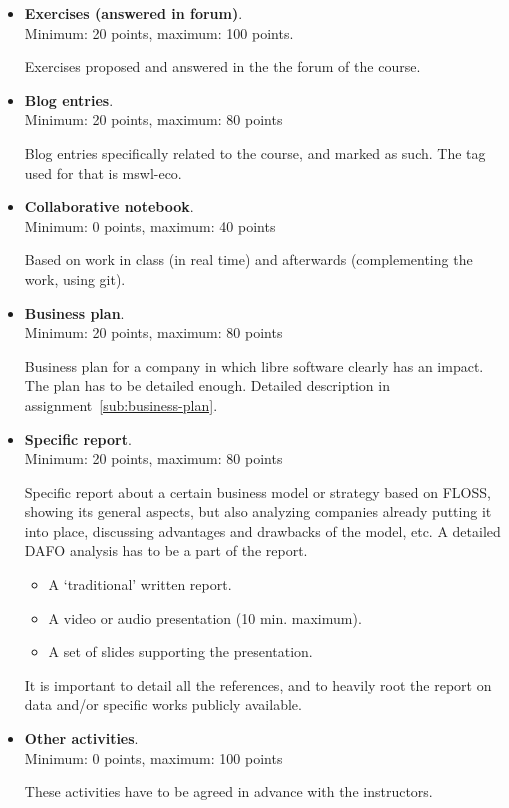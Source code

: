 \documentclass[a4paper]{article}
\begin{document}
\begin{itemize}
\item \textbf{Exercises (answered in forum)}. \\
  Minimum: 20 points, maximum: 100 points.

  Exercises proposed and answered in the the forum of the course.

\item \textbf{Blog entries}. \\
  Minimum: 20 points, maximum: 80 points

  Blog entries specifically related to the course, and marked as such. The tag used for that is mswl-eco.

\item \textbf{Collaborative notebook}. \\
  Minimum: 0 points, maximum: 40 points

  Based on work in class (in real time) and afterwards (complementing the work, using git).

\item \textbf{Business plan}. \\
  Minimum: 20 points, maximum: 80 points

  Business plan for a company in which libre software clearly has an impact. The plan has to be detailed enough. Detailed description in assignment~\ref{sub:business-plan}.

\item \textbf{Specific report}. \\
  Minimum: 20 points, maximum: 80 points

Specific report about a certain business model or strategy based on FLOSS, showing its general aspects, but also analyzing companies already putting it into place, discussing advantages and drawbacks of the model, etc. A detailed DAFO analysis has to be a part of the report.

\begin{itemize}
\item A `traditional' written report.
\item A video or audio presentation (10 min. maximum).
\item A set of slides supporting the presentation.
\end{itemize}

 It is important to detail all the references, and to heavily root the report on data and/or specific works publicly available.

\item \textbf{Other activities}. \\
  Minimum: 0 points, maximum: 100 points

  These activities have to be agreed in advance with the instructors.
\end{itemize}
\end{document}
